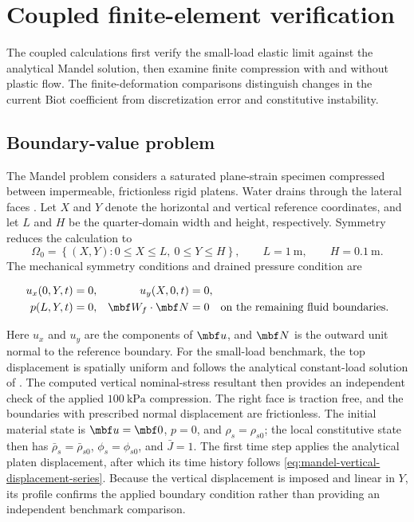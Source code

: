 \section{Coupled finite-element verification}
\label{sec:mandel-verification}

The coupled calculations first verify the small-load elastic limit against the
analytical Mandel solution, then examine finite compression with and without
plastic flow. The finite-deformation comparisons distinguish changes in the
current Biot coefficient from discretization error and constitutive instability.

\subsection{Boundary-value problem}
\label{sec:mandel-boundary-value-problem}

The Mandel problem considers a saturated plane-strain specimen compressed
between impermeable, frictionless rigid platens.  Water drains through the
lateral faces \citep{chengdetournay1988}.  Let \(X\) and \(Y\) denote the
horizontal and vertical reference coordinates, and let \(L\) and \(H\) be the
quarter-domain width and height, respectively.  Symmetry reduces the
calculation to
\begin{equation*}
 \Omega_0=\left\{(X,Y):0\leq X\leq L,\ 0\leq Y\leq H\right\},
 \qquad
 L=1\ \mathrm{m},
 \qquad
 H=0.1\ \mathrm{m}.
\end{equation*}
The mechanical symmetry conditions and drained pressure condition are


 \begin{align*}
  u_x(0,Y,t)&=0,
  &u_y(X,0,t)&=0,
\\
  p(L,Y,t)&=0,
  &\mbf W_f\mathbin{\cdot}\mbf N&=0
  \quad\text{on the remaining fluid boundaries}.
 \end{align*}

Here \(u_x\) and \(u_y\) are the components of \(\mbf u\), and \(\mbf N\) is
the outward unit normal to the reference boundary.
For the small-load benchmark, the top displacement is spatially uniform and
follows the analytical
constant-load solution of \citet{chengdetournay1988}.  The computed vertical
nominal-stress resultant then provides an independent check of the applied
\(100\ \mathrm{kPa}\) compression.  The right face is traction free, and the
boundaries with prescribed normal displacement are frictionless.  The
initial material state is
\(\mbf u=\mbf0\), \(p=0\), and \(\rho_s=\rho_{s0}\); the local constitutive
state then has \(\bar\rho_s=\bar\rho_{s0}\), \(\phi_s=\phi_{s0}\), and
\(\bar J=1\).  The first time step applies the analytical platen
displacement, after which its time history follows
\eqref{eq:mandel-vertical-displacement-series}.  Because the vertical
displacement is imposed and linear in \(Y\), its profile confirms the applied
boundary condition rather than providing an independent benchmark
comparison.

